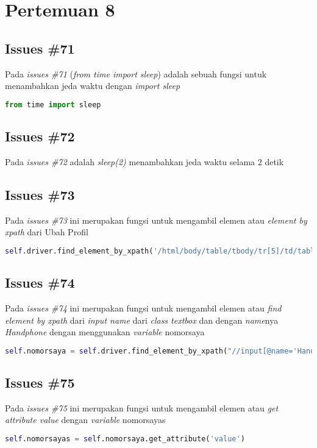 \chapter{Pertemuan 8}

\section{Issues \#71}
Pada \textit{issues \#71} (\textit{from time import sleep}) adalah sebuah fungsi untuk menambahkan jeda waktu dengan \textit{import sleep}
\begin{lstlisting}[language=Python]
from time import sleep
\end{lstlisting}


\section{Issues \#72}
Pada \textit{issues \#72} adalah \textit{sleep(2)} menambahkan jeda waktu selama 2 detik

\section{Issues \#73}
Pada \textit{issues \#73} ini merupakan fungsi untuk mengambil elemen atau \textit{element by xpath} dari Ubah Profil
\begin{lstlisting}[language=Python]
  self.driver.find_element_by_xpath('/html/body/table/tbody/tr[5]/td/table[1]/tbody/tr/td[1]/table[2]/tbody/tr[1]/td[2]/a[1]').click()
\end{lstlisting}

\section{Issues \#74}
Pada \textit{issues \#74} ini merupakan fungsi untuk mengambil elemen atau \textit{find element by xpath} dari \textit{input name} dari \textit{class textbox} dan dengan \textit{name}nya \textit{Handphone} dengan menggunakan \textit{variable} nomorsaya
\begin{lstlisting}[language=Python]
self.nomorsaya = self.driver.find_element_by_xpath("//input[@name='Handphone']")
\end{lstlisting}

\section{Issues \#75}
Pada \textit{issues \#75} ini merupakan fungsi untuk mengambil elemen atau \textit{get attribute value} dengan \textit{variable} nomorsayas
\begin{lstlisting}[language=Python]
self.nomorsayas = self.nomorsaya.get_attribute('value')
\end{lstlisting}



